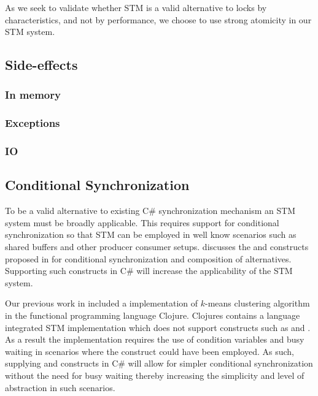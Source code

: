 As we seek to validate whether \ac{STM} is a valid alternative to locks by characteristics, and not by performance, we choose to use strong atomicity in our \ac{STM} system.

\subsection{Side-effects}

\subsubsection{In memory}
\subsubsection{Exceptions}

\subsubsection{IO}


 
\subsection{Conditional Synchronization}
\label{sec:req_conditional}
To be a valid alternative to existing C\# synchronization mechanism an \ac{STM} system must be broadly applicable. This requires support for conditional synchronization so that \ac{STM} can be employed in well know scenarios such as shared buffers and other producer consumer setups\cite[p. 128]{tanenbaum2008modern}.  discusses the  and  constructs proposed in \cite{harris2005composable} for conditional synchronization and composition of alternatives. Supporting such constructs in C\# will increase the applicability of the \ac{STM} system.

Our previous work in \cite{dpt907e14trending} included a implementation of $k$-means clustering algorithm\cite[p. 451]{dataminingconceptsandtechniques} in the functional programming language Clojure. Clojures contains a language integrated \ac{STM} implementation which does not support constructs such as  and . As a result the implementation requires the use of condition variables and busy waiting in scenarios where the  construct could have been employed\cite{duffy2010stmnet}.  As such, supplying  and  constructs in C\# will allow for simpler conditional synchronization without the need for busy waiting thereby increasing the simplicity and level of abstraction in such scenarios.
